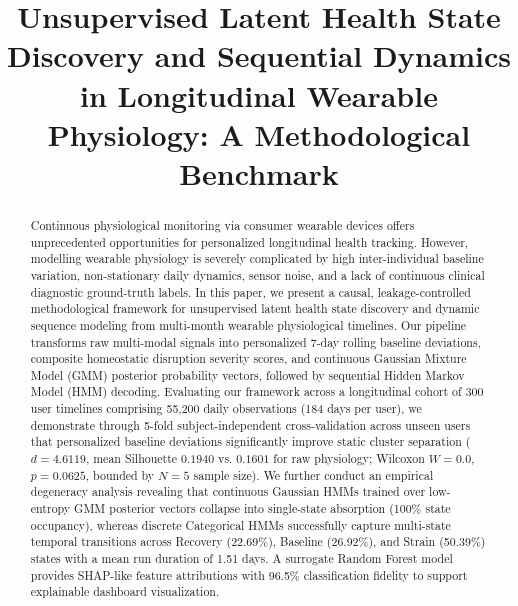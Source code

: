 \documentclass[conference]{IEEEtran}
\begin{document}
\title{Unsupervised Latent Health State Discovery and Sequential Dynamics in Longitudinal Wearable Physiology: A Methodological Benchmark}

\author{
}

\maketitle

\begin{abstract}
Continuous physiological monitoring via consumer wearable devices offers unprecedented opportunities for personalized longitudinal health tracking. However, modelling wearable physiology is severely complicated by high inter-individual baseline variation, non-stationary daily dynamics, sensor noise, and a lack of continuous clinical diagnostic ground-truth labels. In this paper, we present a causal, leakage-controlled methodological framework for unsupervised latent health state discovery and dynamic sequence modeling from multi-month wearable physiological timelines. Our pipeline transforms raw multi-modal signals into personalized 7-day rolling baseline deviations, composite homeostatic disruption severity scores, and continuous Gaussian Mixture Model (GMM) posterior probability vectors, followed by sequential Hidden Markov Model (HMM) decoding. Evaluating our framework across a longitudinal cohort of 300 user timelines comprising 55,200 daily observations (184 days per user), we demonstrate through 5-fold subject-independent cross-validation across unseen users that personalized baseline deviations significantly improve static cluster separation ($d = 4.6119$, mean Silhouette $0.1940$ vs. $0.1601$ for raw physiology; Wilcoxon $W = 0.0$, $p = 0.0625$, bounded by $N=5$ sample size). We further conduct an empirical degeneracy analysis revealing that continuous Gaussian HMMs trained over low-entropy GMM posterior vectors collapse into single-state absorption (100\% state occupancy), whereas discrete Categorical HMMs successfully capture multi-state temporal transitions across Recovery (22.69\%), Baseline (26.92\%), and Strain (50.39\%) states with a mean run duration of 1.51 days. A surrogate Random Forest model provides SHAP-like feature attributions with 96.5\% classification fidelity to support explainable dashboard visualization.
\end{abstract}
\end{document}
